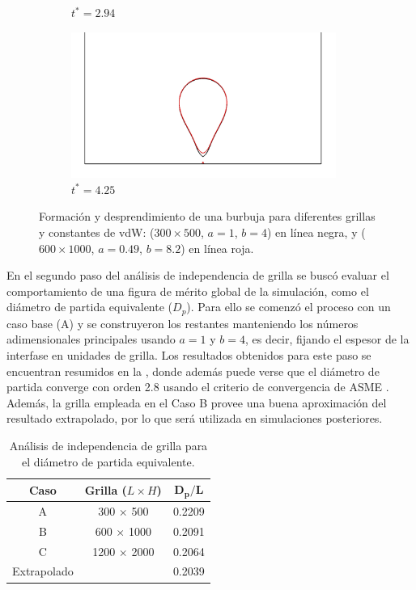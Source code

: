 \begin{figure}[htb]
\begin{subfigure}[t]{0.45\textwidth}
        \caption{$t^* = 2.94$}
    \end{subfigure}    
    \begin{subfigure}[t]{0.45\textwidth}
        \centering
        \includegraphics[width=0.95\textwidth]{Imagenes/HetBoiling/GridIndep_1/130}
        \caption{$t^* = 4.25$}
    \end{subfigure}    
    \caption{Formaci\'on y desprendimiento de una burbuja para diferentes grillas y constantes de vdW: ($300 \times 500$, $a=1$, $b=4$) en l\'inea negra, y ($600 \times 1000$, $a=0.49$, $b=8.2$) en l\'inea roja.}
    \label{fig:bubble2D_step1}
\end{figure}

En el segundo paso del an\'alisis de independencia de grilla se busc\'o evaluar el comportamiento de una figura de m\'erito global de la simulaci\'on, como el di\'ametro de partida equivalente ($D_p$). Para ello se comenz\'o el proceso con un caso base (A) y se construyeron los restantes manteniendo los n\'umeros adimensionales principales usando $a=1$ y $b=4$, es decir, fijando el espesor de la interfase en unidades de grilla. Los resultados obtenidos para este paso se encuentran resumidos en la , donde adem\'as puede verse que el di\'ametro de partida converge con orden 2.8 usando el criterio de convergencia de ASME \cite{freitas_asmes_2003}. Adem\'as, la grilla empleada en el Caso B provee una buena aproximaci\'on del resultado extrapolado, por lo que ser\'a utilizada en simulaciones posteriores.

\begin{table}[ht]
	\centering
    \begin{tabular}{c c c}
	    \toprule
        \bf Caso & \bf Grilla ($L\times H$) & $\bm{D_p/L}$  \\
        \midrule
		A & 300  $\times$ 500  &  0.2209 \\
		B & 600  $\times$ 1000 &  0.2091 \\		
		C & 1200 $\times$ 2000 &  0.2064 \\		
		Extrapolado &          &  0.2039 \\		
        \bottomrule
	\end{tabular}
	\caption{An\'alisis de independencia de grilla para el di\'ametro de partida equivalente.}
	\label{tab:gridindep_step2}
\end{table} 


